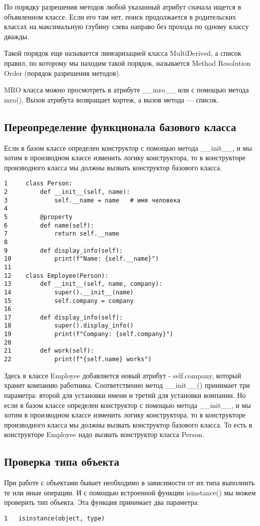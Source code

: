 \documentclass[12pt, a4paper]{article}
\begin{document}
По порядку разрешения методов любой указанный атрибут сначала ищется в объявленном классе. Если его там нет, поиск продолжается в родительских классах на максимальную глубину слева направо без прохода по одному классу дважды.

Такой порядок еще называется линеаризацией класса MultiDerived, а список правил, по которому мы находим такой порядок, называется Method Resolution Order (порядок разрешения методов).


MRO класса можно просмотреть в атрибуте \_\_mro\_\_ или с помощью метода mro(). Вызов атрибута возвращает кортеж, а вызов метода — список.

\subsection{Переопределение функционала базового класса}

Если в базом классе определен конструктор с помощью метода \_\_init\_\_, и мы хотим в производном классе изменить логику конструктора, то в конструкторе производного класса мы должны вызвать конструктор базового класса.

\begin{verbatim}
1     class Person: 
2         def __init__(self, name):
3             self.__name = name   # имя человека
4  
5         @property
6         def name(self):
7             return self.__name
8 
9         def display_info(self):
10            print(f"Name: {self.__name}") 
11 
12    class Employee(Person):
13        def __init__(self, name, company):
14            super().__init__(name)
15            self.company = company
16    
17        def display_info(self):
18            super().display_info()
19            print(f"Company: {self.company}")
20    
21        def work(self):
22            print(f"{self.name} works")
\end{verbatim}

Здесь в классе Employee добавляется новый атрибут - self.company, который хранит компанию работника. Соответственно метод \_\_init\_\_() принимает три параметра: второй для установки имени и третий для установки компании. Но если в базом классе определен конструктор с помощью метода \_\_init\_\_, и мы хотим в производном классе изменить логику конструктора, то в конструкторе производного класса мы должны вызвать конструктор базового класса. То есть в конструкторе Employee надо вызвать конструктор класса Person.

\subsection{Проверка типа объекта}

При работе с объектами бывает необходимо в зависимости от их типа выполнить те или иные операции. И с помощью встроенной функции isinstance() мы можем проверить тип объекта. Эта функция принимает два параметра:

\begin{verbatim}	
1   isinstance(object, type)
\end{verbatim}
\end{document}
